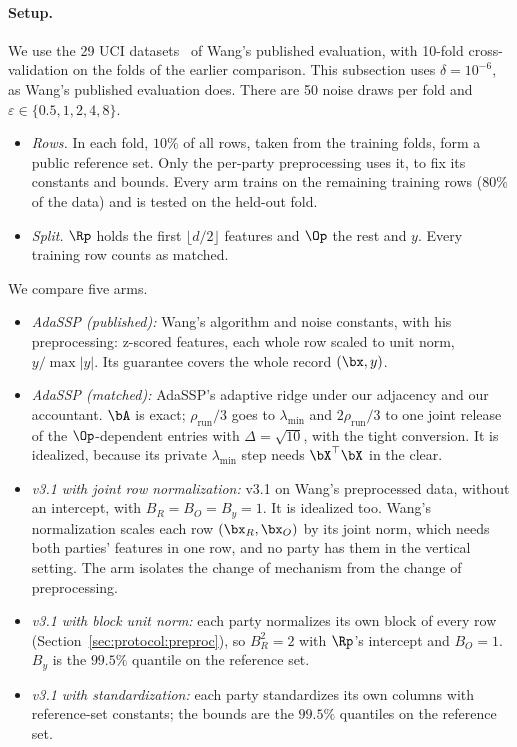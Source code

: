 \paragraph{Setup.} We use the 29 UCI datasets~\cite{dua2019uci} of Wang's published evaluation, with 10-fold cross-validation on the folds of the earlier comparison. This subsection uses $\delta = 10^{-6}$, as Wang's published evaluation does. There are 50 noise draws per fold and $\varepsilon \in \{0.5, 1, 2, 4, 8\}$.
\begin{itemize}[noitemsep]
  \item \emph{Rows.} In each fold, $10\%$ of all rows, taken from the training folds, form a public reference set. Only the per-party preprocessing uses it, to fix its constants and bounds. Every arm trains on the remaining training rows ($80\%$ of the data) and is tested on the held-out fold.
  \item \emph{Split.} $\Rp$ holds the first $\lfloor d/2 \rfloor$ features and $\Op$ the rest and $y$. Every training row counts as matched.
\end{itemize}
We compare five arms.
\begin{itemize}[noitemsep]
  \item[(a)] \emph{AdaSSP (published):} Wang's algorithm and noise constants, with his preprocessing: z-scored features, each whole row scaled to unit norm, $y/\max|y|$. Its guarantee covers the whole record $(\bx, y)$.
  \item[(b)] \emph{AdaSSP (matched):} AdaSSP's adaptive ridge under our adjacency and our accountant. $\bA$ is exact; $\rho_{\mathrm{run}}/3$ goes to $\lambda_{\min}$ and $2\rho_{\mathrm{run}}/3$ to one joint release of the $\Op$-dependent entries with $\Delta = \sqrt{10}$, with the tight conversion. It is idealized, because its private $\lambda_{\min}$ step needs $\bX^{\top}\bX$ in the clear.
  \item[(c)] \emph{v3.1 with joint row normalization:} v3.1 on Wang's preprocessed data, without an intercept, with $B_R = B_O = B_y = 1$. It is idealized too. Wang's normalization scales each row $(\bx_R, \bx_O)$ by its joint norm, which needs both parties' features in one row, and no party has them in the vertical setting. The arm isolates the change of mechanism from the change of preprocessing.
  \item[(d)] \emph{v3.1 with block unit norm:} each party normalizes its own block of every row (Section~\ref{sec:protocol:preproc}), so $B_R^2 = 2$ with $\Rp$'s intercept and $B_O = 1$. $B_y$ is the $99.5\%$ quantile on the reference set.
  \item[(e)] \emph{v3.1 with standardization:} each party standardizes its own columns with reference-set constants; the bounds are the $99.5\%$ quantiles on the reference set.
\end{itemize}
